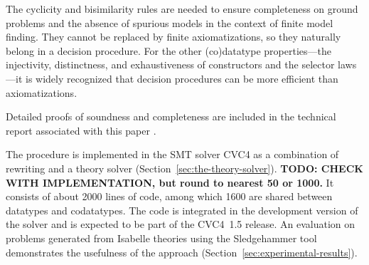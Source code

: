 
The cyclicity and bisimilarity rules are
needed to ensure completeness on ground problems and the absence of spurious
models in the context of finite model finding.
They cannot be replaced by finite
axiomatizations, so they naturally belong in a decision procedure. 
For the other (co)datatype properties---the injectivity, distinctness, and
exhaustiveness of constructors and the selector laws---it is
widely recognized that decision procedures can be more efficient than
axiomatizations.

\begin{paper}
Detailed proofs of soundness and completeness are included in the technical report
associated with this paper \cite{our-report}.
\end{paper}%
The procedure is implemented in the SMT solver CVC4 as a combination
of rewriting and a theory solver
(Section~\ref{sec:the-theory-solver}).
\textbf{TODO: CHECK WITH IMPLEMENTATION, but round to nearest 50 or 1000.}
It consists of about 2000 lines of \cpp{} code, among which 1600 are
shared between datatypes and codatatypes. The code is integrated in the
development version of the solver and is expected to be part of the CVC4~1.5 release.
%
An evaluation on %
problems generated from Isabelle theories using the Sledgehammer tool
demonstrates the usefulness of the approach (Section~\ref{sec:experimental-results}).



%




